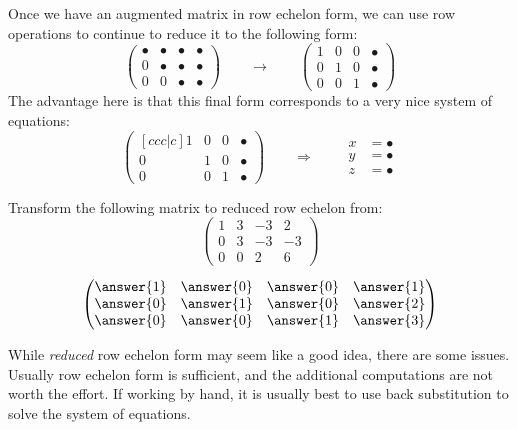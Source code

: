 \documentclass{ximera}
\begin{document}
Once we have an augmented matrix in row echelon form, we can use row
operations to continue to reduce it to the following form:
\[
\begin{pmatrix}
  \bullet & \bullet & \bullet & \bullet \\
     0   & \bullet & \bullet & \bullet \\
     0  &    0 & \bullet & \bullet
\end{pmatrix}
\qquad\longrightarrow\qquad
\begin{pmatrix}
  1 & 0 & 0  & \bullet \\
     0   & 1  &  0 & \bullet \\
     0  &    0 & 1 & \bullet
\end{pmatrix}
\]
The advantage here is that this final form corresponds to a very nice system of equations:
\[
  \begin{pmatrix}[ccc|c]
    1 &   0 & 0 & \bullet  \\
    0 &   1 & 0 & \bullet \\
    0& 0  &  1 & \bullet
  \end{pmatrix}
  \qquad\Longrightarrow\qquad
  \begin{aligned}
    x &= \bullet  \\
    y &= \bullet  \\
    z &=\bullet
  \end{aligned}
\]
\begin{question}
  Transform the following matrix to reduced row echelon from:
  \[
  \begin{pmatrix}
  1 & 3 & -3 & 2  \\
  0 & 3 & -3 & -3 \\
  0 & 0 &  2 & 6
  \end{pmatrix}
  \]
  \begin{prompt}
    \[
    \begin{pmatrix}
      \answer{1} & \answer{0} & \answer{0} & \answer{1} \\
      \answer{0} & \answer{1} & \answer{0} & \answer{2} \\
      \answer{0} & \answer{0} & \answer{1} & \answer{3}
    \end{pmatrix}
    \]
  \end{prompt}
\end{question}
While \textit{reduced} row echelon form may seem like a good idea,
there are some issues.  Usually row echelon form is sufficient, and
the additional computations are not worth the effort.  If working by
hand, it is usually best to use back substitution to solve the system of equations.
\end{document}
